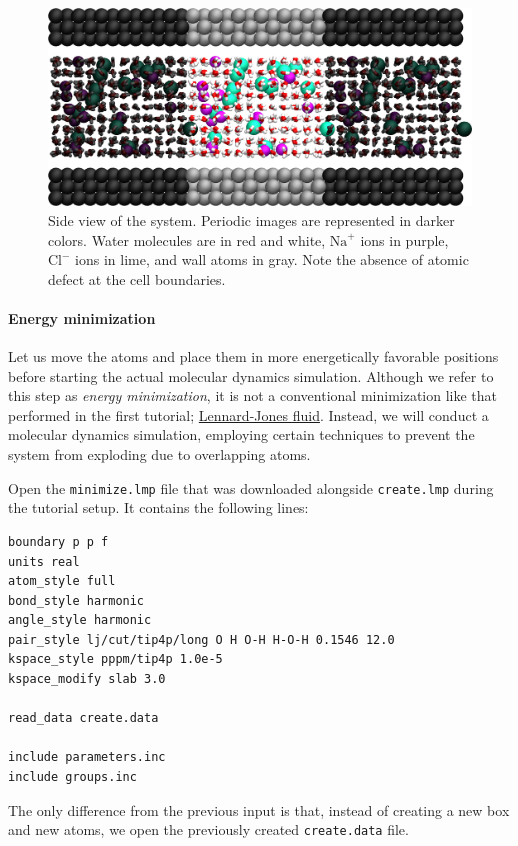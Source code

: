 \documentclass[9pt,tutorial]{livecoms}
\newcommand{\flecmd}[1]{\textcolor{command}{\texttt{#1}}} %
\begin{document}
\begin{figure}
\centering
\includegraphics[width=\linewidth]{NANOSHEAR-system}
\caption{Side view of the system.  Periodic images are represented in darker colors.
Water molecules are in red and white, $\text{Na}^+$ ions in purple, $\text{Cl}^-$
ions in lime, and wall atoms in gray.  Note the absence of atomic defect at the
cell boundaries.}
\label{fig:NANOSHEAR-system}
\end{figure}

\paragraph{Energy minimization}

Let us move the atoms and place them in more energetically favorable positions
before starting the actual molecular dynamics simulation.  Although we refer to this step as
\emph{energy minimization}, it is not a conventional minimization
like that performed in the first tutorial; \hyperref[lennard-jones-label]{Lennard-Jones fluid}.
Instead, we will conduct a molecular dynamics simulation, employing certain techniques
to prevent the system from exploding due to overlapping atoms.

Open the \flecmd{minimize.lmp} file that was downloaded alongside
\flecmd{create.lmp} during the tutorial setup.  It contains the following lines:
\begin{lstlisting}
boundary p p f
units real
atom_style full
bond_style harmonic
angle_style harmonic
pair_style lj/cut/tip4p/long O H O-H H-O-H 0.1546 12.0
kspace_style pppm/tip4p 1.0e-5
kspace_modify slab 3.0

read_data create.data

include parameters.inc
include groups.inc
\end{lstlisting}
The only difference from the previous input is that, instead of creating a new
box and new atoms, we open the previously created \flecmd{create.data} file.
\end{document}
